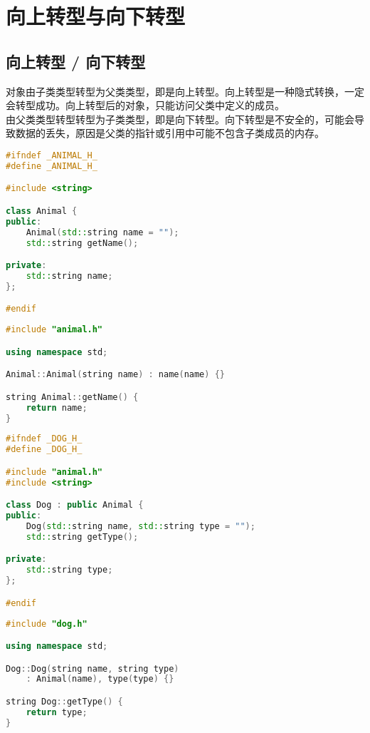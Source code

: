 \newpage

\section{向上转型与向下转型}

\subsection{向上转型 / 向下转型}

对象由子类类型转型为父类类型，即是向上转型。向上转型是一种隐式转换，一定会转型成功。向上转型后的对象，只能访问父类中定义的成员。\\

由父类类型转型转型为子类类型，即是向下转型。向下转型是不安全的，可能会导致数据的丢失，原因是父类的指针或引用中可能不包含子类成员的内存。\\


\begin{lstlisting}[language=C++, title=animal.h]
#ifndef _ANIMAL_H_
#define _ANIMAL_H_

#include <string>

class Animal {
public:
    Animal(std::string name = "");
    std::string getName();

private:
    std::string name;
};

#endif
\end{lstlisting}

\begin{lstlisting}[language=C++, title=animal.cpp]
#include "animal.h"

using namespace std;

Animal::Animal(string name) : name(name) {}

string Animal::getName() {
    return name;
}
\end{lstlisting}

\begin{lstlisting}[language=C++, title=dog.h]
#ifndef _DOG_H_
#define _DOG_H_

#include "animal.h"
#include <string>

class Dog : public Animal {
public:
    Dog(std::string name, std::string type = "");
    std::string getType();

private:
    std::string type;
};

#endif
\end{lstlisting}

\begin{lstlisting}[language=C++, title=dog.cpp]
#include "dog.h"

using namespace std;

Dog::Dog(string name, string type) 
    : Animal(name), type(type) {}

string Dog::getType() {
    return type;
}
\end{lstlisting}

